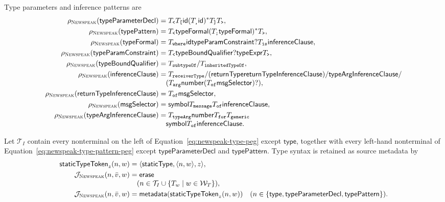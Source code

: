 Type parameters and inference patterns are
\begin{equation}\label{eq:newspeak-type-pattern-peg}
\begin{aligned}
 \rho_{\textsc{Newspeak}}(\mathsf{typeParameterDecl})&=T_{\texttt{<}}T_{\texttt{[}}
      \mathsf{id}(T_{\texttt{,}}\mathsf{id})^*T_{\texttt{]}}T_{\texttt{>}},\\
 \rho_{\textsc{Newspeak}}(\mathsf{typePattern})&=T_{\texttt{<}}\mathsf{typeFormal}
      (T_{\texttt{;}}\mathsf{typeFormal})^*T_{\texttt{>}},\\
 \rho_{\textsc{Newspeak}}(\mathsf{typeFormal})&=T_{\texttt{where}}\mathsf{id}
      \mathsf{typeParamConstraint}?T_{\texttt{is}}\mathsf{inferenceClause},\\
 \rho_{\textsc{Newspeak}}(\mathsf{typeParamConstraint})&=T_{\texttt{<}}
      \mathsf{typeBoundQualifier}?\mathsf{typeExpr}T_{\texttt{>}},\\
 \rho_{\textsc{Newspeak}}(\mathsf{typeBoundQualifier})&=
      T_{\texttt{subtypeOf}}/T_{\texttt{inheritedTypeOf}},\\
 \rho_{\textsc{Newspeak}}(\mathsf{inferenceClause})&=T_{\texttt{receiverType}}/
      (\mathsf{returnType}\mathsf{returnTypeInferenceClause})/
      \mathsf{typeArgInferenceClause}/\\[-1mm]
 &\quad(T_{\texttt{arg}}\mathsf{number}
      (T_{\texttt{of}}\mathsf{msgSelector})?),\\
 \rho_{\textsc{Newspeak}}(\mathsf{returnTypeInferenceClause})&=
      T_{\texttt{of}}\mathsf{msgSelector},\\
 \rho_{\textsc{Newspeak}}(\mathsf{msgSelector})&=
      \mathsf{symbol}T_{\texttt{message}}T_{\texttt{of}}
      \mathsf{inferenceClause},\\
 \rho_{\textsc{Newspeak}}(\mathsf{typeArgInferenceClause})&=T_{\texttt{typeArg}}
      \mathsf{number}T_{\texttt{for}}T_{\texttt{generic}}\\[-1mm]
 &\quad\mathsf{symbol}T_{\texttt{of}}\mathsf{inferenceClause}.
\end{aligned}
\end{equation}

Let $\mathcal T_I$ contain every nonterminal on the left of
Equation~\eqref{eq:newspeak-type-peg} except $\mathsf{type}$, together with
every left-hand nonterminal of Equation~\eqref{eq:newspeak-type-pattern-peg}
except $\mathsf{typeParameterDecl}$ and $\mathsf{typePattern}$.  Type syntax is
retained as source metadata by
\begin{equation}\label{eq:newspeak-type-actions}
\begin{aligned}
 \mathsf{staticTypeToken}_{z}(n,w)&=
   \langle\mathsf{staticType},\langle n,w\rangle,z\rangle,\\
 \mathcal J_{\textsc{Newspeak}}(n,\bar v,w)&=\mathsf{erase}\\[-1mm]
 &\quad(n\in\mathcal T_I\cup\{T_w\mid w\in\mathcal W_T\}),\\
 \mathcal J_{\textsc{Newspeak}}(n,\bar v,w)&=
   \mathsf{metadata}(\mathsf{staticTypeToken}_{z}(n,w))
   \quad(n\in\{\mathsf{type},\mathsf{typeParameterDecl},
                 \mathsf{typePattern}\}).
\end{aligned}
\end{equation}

